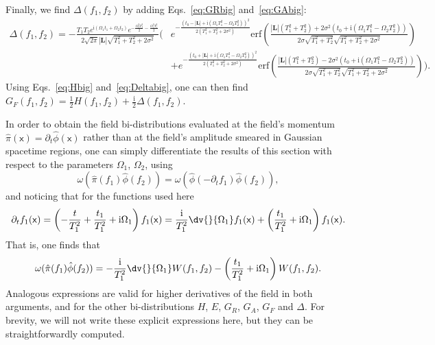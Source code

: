 \documentclass[letterpaper,12pt,titlepage,oneside,final]{book}
\newcommand{\mf}{\mathsf}%
\newcommand{\ii}{\mathrm{i}}
\begin{document}
Finally, we find $\Delta(f_1,f_2)$ by adding Eqs.~\eqref{eq:GRbig} and~\eqref{eq:GAbig}:{\footnotesize
\begin{align}
    \Delta(f_1,f_2) = - \frac{T_1T_2e^{\ii (\Omega_1 t_1+\Omega_2 t_2)}e^{- \frac{\Omega_2^2 T_2^2}{2} - \frac{\Omega_1^2 T_1^2}{2}}}{2\sqrt{2\pi}|\bm L|\sqrt{T_1^2 + T_2^2 + 2\sigma^2}}\Bigg(&e^{- \frac{(t_0 - |\bm L|+\ii (\Omega_1 T_1^2- \Omega_2 T_2^2))^2}{2(T_1^2 + T_2^2 + 2\sigma^2)}} \text{erf}\left(\tfrac{|\bm L|(T_1^2+T_2^2)+2\sigma^2(t_0+\ii (\Omega_1 T_1^2- \Omega_2 T_2^2))}{2\sigma\sqrt{T_1^2 + T_2^2}\sqrt{T_1^2 + T_2^2 + 2\sigma^2}}\right)\nonumber\\
    &+e^{- \frac{(t_0 + |\bm L|+\ii (\Omega_1 T_1^2- \Omega_2 T_2^2))^2}{2(T_1^2 + T_2^2 + 2\sigma^2)}}\text{erf}\left(\tfrac{|\bm L|(T_1^2+T_2^2) - 2\sigma^2(t_0+\ii (\Omega_1 T_1^2- \Omega_2 T_2^2))}{2\sigma\sqrt{T_1^2 + T_2^2}\sqrt{T_1^2 + T_2^2 + 2\sigma^2}}\right)\Bigg).\label{eq:Deltabig}
\end{align}}
Using Eqs.~\eqref{eq:Hbig} and~\eqref{eq:Deltabig}, one can then find $G_F(f_1,f_2) = \frac{1}{2}H(f_1,f_2) + \frac{\ii}{2}\Delta(f_1,f_2)$.


In order to obtain the field bi-distributions evaluated at the field's momentum $\hat{\pi}(\mf x) = \partial_t \hat{\phi}(\mf x)$ rather than at the field's amplitude smeared in Gaussian spacetime regions, one can simply differentiate the results of this section with respect to the parameters $\Omega_1$, $\Omega_2$, using
\begin{equation}
    \omega( \hat{\pi}(f_1)\hat{\phi}(f_2)) = \omega( \hat{\phi}(-\partial_tf_1)\hat{\phi}(f_2)),
\end{equation}
and noticing that for the functions used here
\begin{equation}
    \partial_t f_1(\mf x) = \left(- \frac{t}{T_1^2} + \frac{t_1}{T_1^2} + \ii \Omega_1\right) f_1(\mf x) = \frac{\ii}{T_1^2}\dv{}{\Omega_1}f_1(\mf x) + \left(\frac{t_1}{T_1^2} + \ii \Omega_1\right) f_1(\mf x).
\end{equation}
That is, one finds that
\begin{equation}
    \omega( \hat{\pi}(f_1)\hat{\phi}(f_2)) =  - \frac{\ii}{T_1^2}\dv{}{\Omega_1}W(f_1,f_2) -\left(\frac{t_1}{T_1^2} + \ii \Omega_1\right) W(f_1,f_2).
\end{equation}
Analogous expressions are valid for higher derivatives of the field in both arguments, and for the other bi-distributions $H$, $E$, $G_R$, $G_A$, $G_F$ and $\Delta$. For brevity, we will not write these explicit expressions here, but they can be straightforwardly computed.
\end{document}
